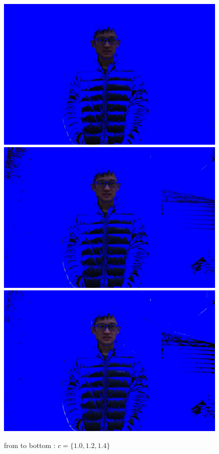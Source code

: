 \documentclass[final]{cvpr}
\begin{document}
\begin{figure}[ht]
   \centering
   \includegraphics[scale=0.035]{../data/output/arthas_final_nf_1.0_0.10_10_10.JPG}
   \includegraphics[scale=0.035]{../data/output/arthas_final_nf_1.2_0.10_10_10.JPG}
   \includegraphics[scale=0.035]{../data/output/arthas_final_nf_1.4_0.10_10_10.JPG}
   \caption{from to bottom : $ c = \{1.0,1.2,1.4\}$}
\end{figure}
\end{document}

